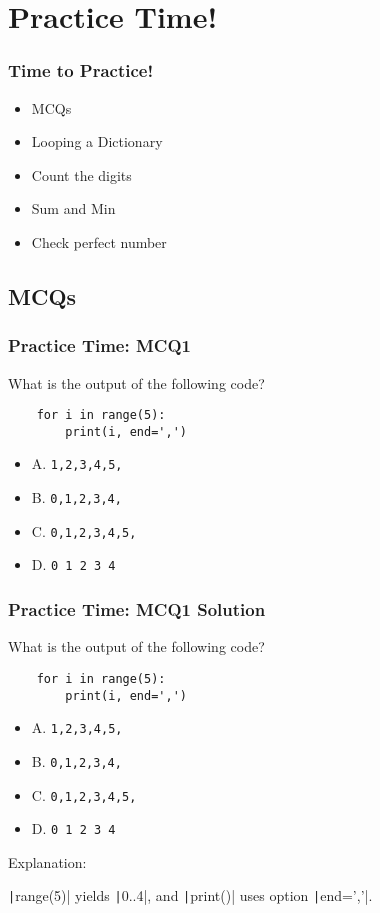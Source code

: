 \documentclass{beamer}
\begin{document}
\section{Practice Time!}

\begin{frame}
    \frametitle{Time to Practice!}
    \begin{itemize}
        \item MCQs
        \item Looping a Dictionary
        \item Count the digits
        \item Sum and Min
        \item Check perfect number
    \end{itemize}
\end{frame}


\subsection{MCQs}

\begin{frame}[fragile]
    \frametitle{Practice Time: MCQ1}
    What is the output of the following code?
    \begin{verbatim}
    for i in range(5):
        print(i, end=',')
    \end{verbatim}
    \begin{itemize}
        \item A. \texttt{1,2,3,4,5,}
        \item B. \texttt{0,1,2,3,4,}
        \item C. \texttt{0,1,2,3,4,5,}
        \item D. \texttt{0 1 2 3 4}
    \end{itemize}
\end{frame}
\begin{frame}[fragile]
    \frametitle{Practice Time: MCQ1 Solution}
    What is the output of the following code?
    \begin{verbatim}
    for i in range(5):
        print(i, end=',')
    \end{verbatim}
    \begin{itemize}
        \item A. \texttt{1,2,3,4,5,}
        \item \alert{B. \texttt{0,1,2,3,4,}}
        \item C. \texttt{0,1,2,3,4,5,}
        \item D. \texttt{0 1 2 3 4}
    \end{itemize}

    Explanation:

    \texttt|range(5)| yields \texttt|0..4|, and
    \texttt|print()| uses option \texttt|end=','|.
\end{frame}
\end{document}
